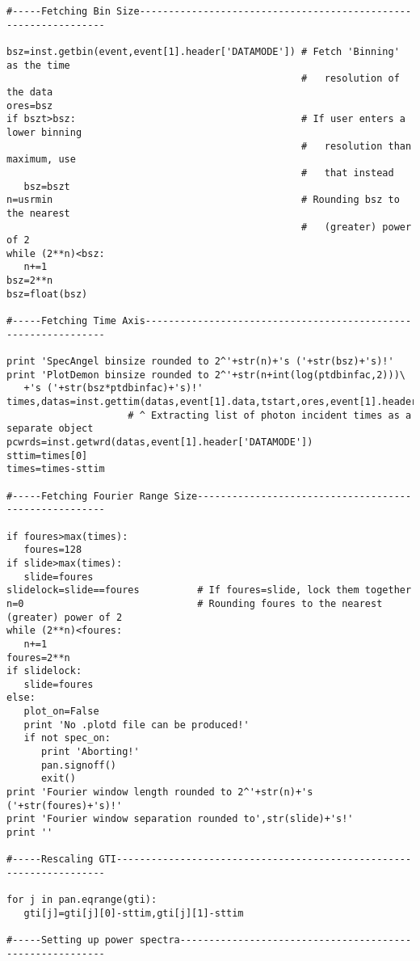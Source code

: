 \begin{verbatim}
#-----Fetching Bin Size----------------------------------------------------------------

bsz=inst.getbin(event,event[1].header['DATAMODE']) # Fetch 'Binning' as the time
                                                   #   resolution of the data
ores=bsz
if bszt>bsz:                                       # If user enters a lower binning
                                                   #   resolution than maximum, use
                                                   #   that instead
   bsz=bszt
n=usrmin                                           # Rounding bsz to the nearest
                                                   #   (greater) power of 2
while (2**n)<bsz:
   n+=1
bsz=2**n
bsz=float(bsz)

#-----Fetching Time Axis---------------------------------------------------------------

print 'SpecAngel binsize rounded to 2^'+str(n)+'s ('+str(bsz)+'s)!'
print 'PlotDemon binsize rounded to 2^'+str(n+int(log(ptdbinfac,2)))\
   +'s ('+str(bsz*ptdbinfac)+'s)!'
times,datas=inst.gettim(datas,event[1].data,tstart,ores,event[1].header['DATAMODE'])
                     # ^ Extracting list of photon incident times as a separate object
pcwrds=inst.getwrd(datas,event[1].header['DATAMODE'])
sttim=times[0]
times=times-sttim

#-----Fetching Fourier Range Size------------------------------------------------------

if foures>max(times):
   foures=128
if slide>max(times):
   slide=foures
slidelock=slide==foures          # If foures=slide, lock them together
n=0                              # Rounding foures to the nearest (greater) power of 2
while (2**n)<foures:
   n+=1
foures=2**n
if slidelock:
   slide=foures
else:
   plot_on=False
   print 'No .plotd file can be produced!'
   if not spec_on:
      print 'Aborting!'
      pan.signoff()
      exit()
print 'Fourier window length rounded to 2^'+str(n)+'s ('+str(foures)+'s)!'
print 'Fourier window separation rounded to',str(slide)+'s!'
print ''

#-----Rescaling GTI--------------------------------------------------------------------

for j in pan.eqrange(gti):
   gti[j]=gti[j][0]-sttim,gti[j][1]-sttim

#-----Setting up power spectra---------------------------------------------------------


\end{verbatim}
